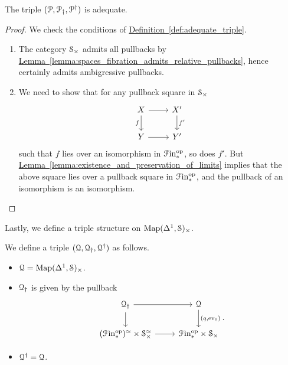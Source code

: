 \documentclass[main.tex]{subfiles}
\begin{document}
\begin{proposition}
  The triple $\triple{P}$ is adequate.
\end{proposition}
\begin{proof}
  We check the conditions of \hyperref[def:adequate_triple]{Definition~\ref*{def:adequate_triple}}.
  \begin{enumerate}
    \item The category $\S_{\times}$ admits all pullbacks by \hyperref[lemma:spaces_fibration_admits_relative_pullbacks]{Lemma~\ref*{lemma:spaces_fibration_admits_relative_pullbacks}}, hence certainly admits ambigressive pullbacks.

    \item We need to show that for any pullback square in $\S_{\times}$
      \begin{equation*}
        \begin{tikzcd}
          X
          \arrow[r]
          \arrow[d, swap, "f"]
          & X'
          \arrow[d, "f'"]
          \\
          Y
          \arrow[r]
          & Y'
        \end{tikzcd}
      \end{equation*}
      such that $f$ lies over an isomorphism in $\Finp\op$, so does $f'$. But \hyperref[lemma:existence_and_preservation_of_limits]{Lemma~\ref*{lemma:existence_and_preservation_of_limits}} implies that the above square lies over a pullback square in $\Finp\op$, and the pullback of an isomorphism is an isomorphism.
  \end{enumerate}
\end{proof}

Lastly, we define a triple structure on $\Map(\Delta^{1}, \S)_{\times}$.
\begin{definition}
  We define a triple $\triple{Q}$ as follows.
  \begin{itemize}
    \item $\mathcal{Q} = \Map(\Delta^{1}, \S)_{\times}$.
  
     \item $\mathcal{Q}\downdag$ is given by the pullback
      \begin{equation*}
        \begin{tikzcd}
          \mathcal{Q}\downdag
          \arrow[r]
          \arrow[d]
          & \mathcal{Q}
          \arrow[d, "{(q, \ev_{0})}"]
          \\
          (\Finp\op)^{\simeq} \times \S_{\times}^{\simeq}
          \arrow[r]
          & \Finp\op \times \S_{\times}
        \end{tikzcd}.
      \end{equation*}
  
    \item $\mathcal{Q}\updag = \mathcal{Q}$.
  \end{itemize}
\end{definition}
\end{document}
